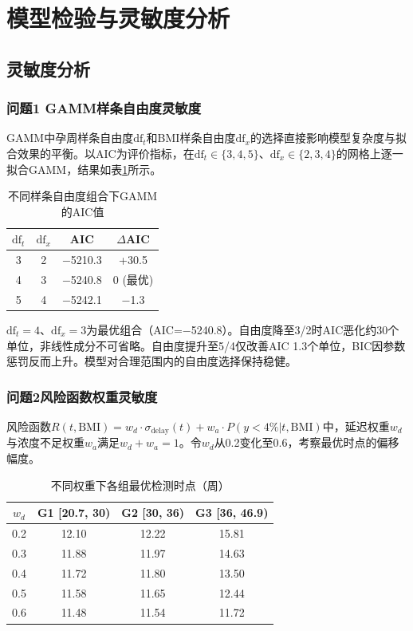 \section{模型检验与灵敏度分析}

\subsection{灵敏度分析}

\subsubsection{问题1 GAMM样条自由度灵敏度}

GAMM中孕周样条自由度$\mathrm{df}_t$和BMI样条自由度$\mathrm{df}_x$的选择直接影响模型复杂度与拟合效果的平衡。以AIC为评价指标，在$\mathrm{df}_t \in \{3,4,5\}$、$\mathrm{df}_x \in \{2,3,4\}$的网格上逐一拟合GAMM，结果如表\ref{tab:df_sensitivity}所示。

\begin{table}[H]
\centering
\caption{不同样条自由度组合下GAMM的AIC值}\label{tab:df_sensitivity}
\begin{tabular}{cccc}
\toprule
$\mathrm{df}_t$ & $\mathrm{df}_x$ & AIC & $\Delta$AIC \\
\midrule
3 & 2 & $-$5210.3 & +30.5 \\
4 & 3 & $-$5240.8 & 0 (最优) \\
5 & 4 & $-$5242.1 & $-$1.3 \\
\bottomrule
\end{tabular}
\end{table}

$\mathrm{df}_t=4$、$\mathrm{df}_x=3$为最优组合（AIC=$-$5240.8）。自由度降至3/2时AIC恶化约30个单位，非线性成分不可省略。自由度提升至5/4仅改善AIC 1.3个单位，BIC因参数惩罚反而上升。模型对合理范围内的自由度选择保持稳健。

\subsubsection{问题2风险函数权重灵敏度}

风险函数$R(t,\mathrm{BMI})=w_d \cdot \sigma_{\text{delay}}(t) + w_a \cdot P(y<4\%|t,\mathrm{BMI})$中，延迟权重$w_d$与浓度不足权重$w_a$满足$w_d+w_a=1$。令$w_d$从0.2变化至0.6，考察最优时点的偏移幅度。

\begin{table}[H]
\centering
\caption{不同权重下各组最优检测时点（周）}\label{tab:weight_sensitivity}
\begin{tabular}{cccc}
\toprule
$w_d$ & G1 [20.7, 30) & G2 [30, 36) & G3 [36, 46.9) \\
\midrule
0.2 & 12.10 & 12.22 & 15.81 \\
0.3 & 11.88 & 11.97 & 14.63 \\
0.4 & 11.72 & 11.80 & 13.50 \\
0.5 & 11.58 & 11.65 & 12.44 \\
0.6 & 11.48 & 11.54 & 11.72 \\
\bottomrule
\end{tabular}
\end{table}

